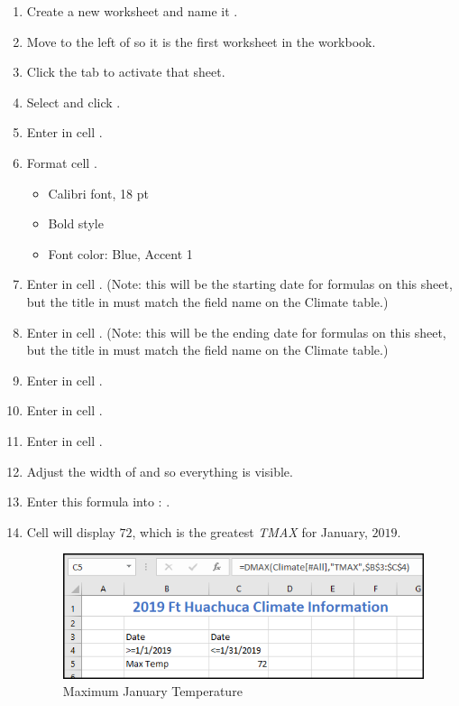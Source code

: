 \begin{enumerate}[resume]
	\item Create a new worksheet and name it .
	\item Move  to the left of  so it is the first worksheet in the workbook.
	\item Click the  tab to activate that sheet.
	\item Select  and click .
	\item Enter  in cell .
	\item Format cell .
	
		\begin{itemize}
			\item Calibri font, 18 pt
			\item Bold style
			\item Font color: Blue, Accent 1
		\end{itemize}

	\item Enter  in cell . (Note: this will be the starting date for formulas on this sheet, but the title in  must match the field name on the Climate table.)
	\item Enter  in cell . (Note: this will be the ending date for formulas on this sheet, but the title in  must match the field name on the Climate table.)
	\item Enter  in cell .
	\item Enter  in cell .
	\item Enter  in cell .
	\item Adjust the width of  and  so everything is visible.
	\item Enter this formula into : .
	\item Cell  will display $ 72 $, which is the greatest \textit{TMAX} for January, $ 2019 $.

	\begin{figure}[H]
		\centering
		\includegraphics[width=\maxwidth{.95\linewidth}]{gfx/ch09_fig86}
		\caption{Maximum January Temperature}
		\label{09:fig86}
	\end{figure}


\end{enumerate}
